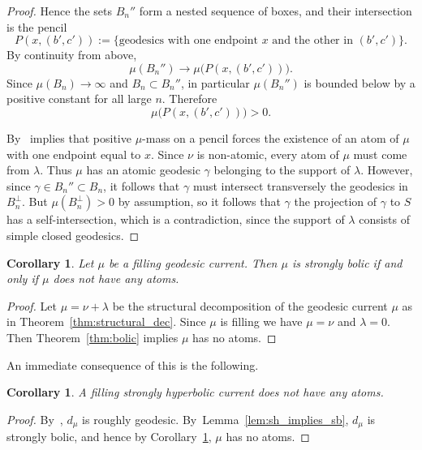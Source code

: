 \documentclass[12pt]{amsart}
\newcommand*{\svgfig}[1]{\Huge{}}
\numberwithin{equation}{section}
\numberwithin{figure}{section}
\newtheorem{corollary}[equation]{Corollary}
\theoremstyle{definition}
\theoremstyle{plain}
\begin{document}
\begin{proof}
Hence the sets $B_n''$ form a nested sequence of boxes, and their intersection is the pencil
\[
P(x,(b',c')):=\{\text{geodesics with one endpoint }x\text{ and the other in }(b',c')\}.
\]
By continuity from above,
\[
\mu(B_n'')\longrightarrow \mu\bigl(P(x,(b',c'))\bigr).
\]
Since $\mu(B_n)\to\infty$ and $B_n\subset B_n''$, in particular $\mu(B_n'')$ is bounded below by a positive constant for all large $n$. Therefore
\[
\mu\bigl(P(x,(b',c'))\bigr)>0.
\]

By~\cite[Lemma~2.6]{DRMG23:Duals} implies that positive $\mu$-mass on a pencil forces the existence of an atom of $\mu$ with one endpoint equal to $x$. Since $\nu$ is non-atomic, every atom of $\mu$ must come from $\lambda$. Thus $\mu$ has an atomic geodesic $\gamma$ belonging to the support of $\lambda$.
However, since $\gamma \in B_n'' \subset B_n$, it follows that $\gamma$ must intersect transversely the geodesics in $B_n^{\perp}$. But $\mu(B_n^{\perp})>0$ by assumption, so it follows that $\gamma$ the projection of $\gamma$ to $S$ has a self-intersection, which is a contradiction, since the support of $\lambda$ consists of simple closed geodesics.


\end{proof} 

    \begin{figure}[h!]
\centering{
\resizebox{130mm}{!}{\svgfig{opposite}}
    \caption{ }\label{fig:opposite}
}
\end{figure}



\begin{corollary}
    Let $\mu$ be a filling geodesic current. Then $\mu$ is strongly bolic if and only if $\mu$ does not have any atoms.
\label{cor:fillingsb_noatoms}
\end{corollary}
\begin{proof}
   Let $\mu = \nu + \lambda$ be the structural decomposition of the geodesic current $\mu$ as in Theorem~\ref{thm:structural_dec}. Since $\mu$ is filling we have $\mu = \nu$ and $\lambda=0$. Then Theorem~\ref{thm:bolic} implies $\mu$ has no atoms.
\end{proof}
An immediate consequence of this is the following.
\begin{corollary}
A filling strongly hyperbolic current does not have any atoms.
\label{cor:fillingsh_noatoms}
\end{corollary}
\begin{proof}
By~, $d_\mu$ is roughly geodesic. By~Lemma~\ref{lem:sh_implies_sb}, $d_\mu$ is strongly bolic, and hence by Corollary~\ref{cor:fillingsb_noatoms}, $\mu$ has no atoms.
\end{proof}
\end{document}
